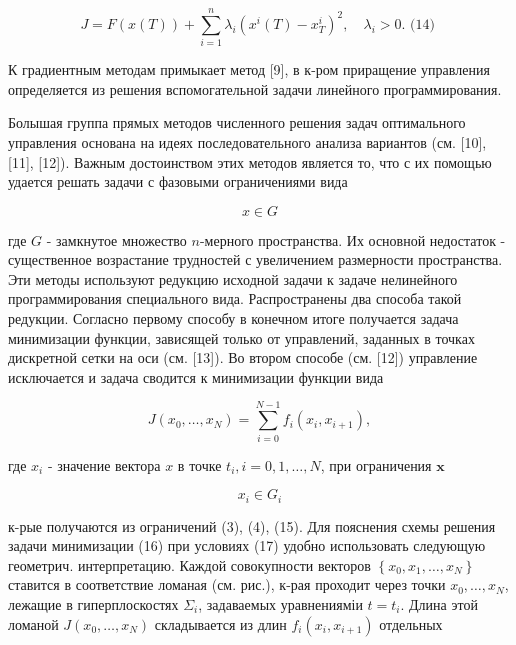 \documentclass[10pt]{article}
\begin{document}
\[

J=F(x(T))+\sum_{i=1}^{n} \lambda_{i}\left(x^{i}(T)-x_{T}^{i}\right)^{2}, \quad \lambda_{i}>0 . \text { (14) }

\]



К градиентным методам примыкает метод [9], в к-ром приращение управления определяется из решения вспомогательной задачи линейного программирования.



Болышая группа прямых методов численного решения задач оптимального управления основана на идеях последовательного анализа вариантов (см. [10], [11], [12]). Важным достоинством этих методов является то, что с их помощью удается решать задачи с фазовыми ограничениями вида



\[

x \in G

\]



где $G$ - замкнутое множество $n$-мерного пространства. Их основной недостаток - существенное возрастание трудностей с увеличением размерности пространства. Эти методы используют редукцию исходной задачи к задаче нелинейного программирования специального вида. Распространены два способа такой редукции. Согласно первому способу в конечном итоге получается задача минимизации функции, зависящей только от управлений, заданных в точках дискретной сетки на оси (см. [13]). Во втором способе (см. [12]) управление исключается и задача сводится к минимизации функции вида



\[

J\left(x_{0}, \ldots, x_{N}\right)=\sum_{i=0}^{N-1} f_{i}\left(x_{i}, x_{i+1}\right),

\]



где $x_{i}$ - значение вектора $x$ в точке $t_{i}, i=0,1, \ldots, N$, при ограничения $\mathbf{x}$



\[

x_{i} \in G_{i}

\]



к-рые получаются из ограничений (3), (4), (15). Для пояснения схемы решения задачи минимизации (16) при условиях (17) удобно использовать следующую геометрич. интерпретацию. Каждой совокупности векторов $\left\{x_{0}, x_{1}, \ldots, x_{N}\right\}$ ставится в соответствие ломаная (см. рис.), к-рая проходит через точки $x_{0}, \ldots, x_{N}$, лежащие в гиперплоскостях $\Sigma_{i}$, задаваемых уравненияміи $t=t_{i}$. Длина этой ломаной $J\left(x_{0}, \ldots, x_{N}\right)$ складывается из длин $f_{i}\left(x_{i}, x_{i+1}\right)$ отдельных
\end{document}
